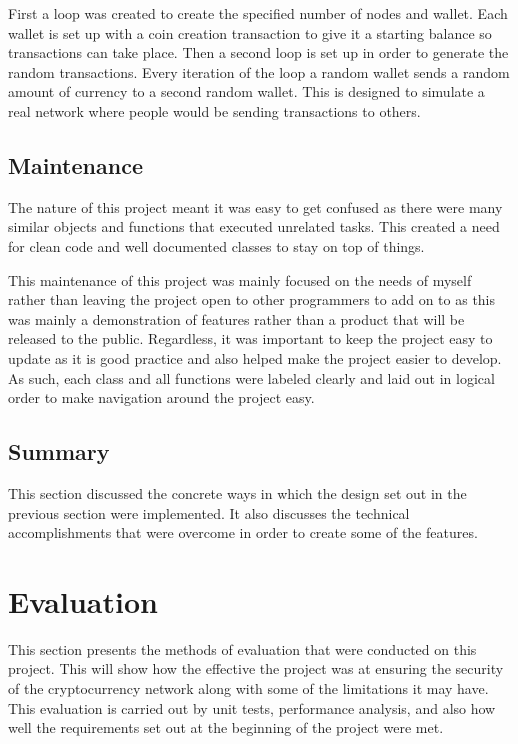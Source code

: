\documentclass{l4proj}
\begin{document}
First a loop was created to create the specified number of nodes and wallet. Each wallet is set up with a coin
creation transaction to give it a starting balance so transactions can take place. Then a second loop is set up
in order to generate the random transactions. Every iteration of the loop a random wallet sends a random amount
of currency to a second random wallet. This is designed to simulate a real network where people would be sending
transactions to others.



\section{Maintenance}
The nature of this project meant it was easy to get confused as there were many similar objects and functions 
that executed unrelated tasks. This created a need for clean code and well documented classes to stay on top 
of things.

This maintenance of this project was mainly focused on the needs of myself rather than leaving the project open
to other programmers to add on to as this was mainly a demonstration of features rather than a product that will
be released to the public. Regardless, it was important to keep the project easy to update as it is good practice
and also helped make the project easier to develop. As such, each class and all functions were labeled clearly
and laid out in logical order to make navigation around the project easy.

\section{Summary}
This section discussed the concrete ways in which the design set out in the previous section were implemented.
It also discusses the technical accomplishments that were overcome in order to create some of the features.

\chapter{Evaluation} 
This section presents the methods of evaluation that were conducted on this project. This will show how the effective the
project was at ensuring the security of the cryptocurrency network along with some of the limitations it may have. 
This evaluation is carried out by unit tests, performance analysis, and also how well the requirements set out at 
the beginning of the project were met.
\end{document}
